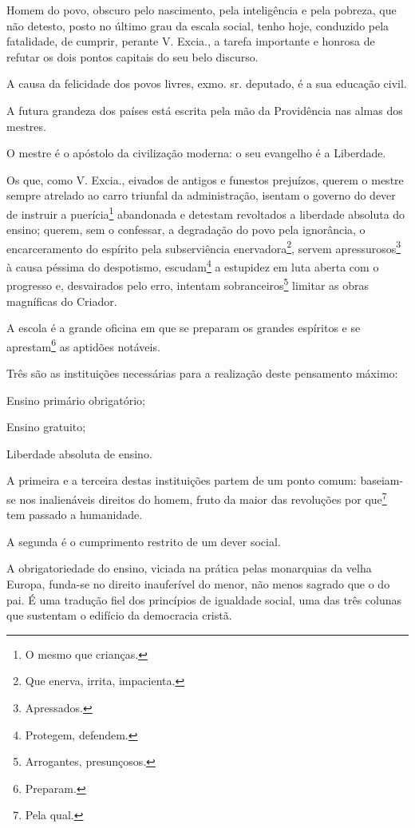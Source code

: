 Homem do povo, obscuro pelo nascimento, pela inteligência e pela
pobreza, que não detesto, posto no último grau da escala social, tenho
hoje, conduzido pela fatalidade, de cumprir, perante V. Excia., a tarefa
importante e honrosa de refutar os dois pontos capitais do seu belo
discurso.

A causa da felicidade dos povos livres, exmo. sr. deputado, é a sua
educação civil.

A futura grandeza dos países está escrita pela mão da Providência nas
almas dos mestres.

O mestre é o apóstolo da civilização moderna: o seu evangelho é a
Liberdade.

Os que, como V. Excia., eivados de antigos e funestos prejuízos, querem
o mestre sempre atrelado ao carro triunfal da administração, isentam o
governo do dever de instruir a puerícia\footnote{O mesmo que crianças.}
abandonada e detestam revoltados a liberdade absoluta do ensino; querem,
sem o confessar, a degradação do povo pela ignorância, o encarceramento
do espírito pela subserviência enervadora\footnote{Que enerva, irrita,
  impacienta.}, servem apressurosos\footnote{Apressados.} à causa
péssima do despotismo, escudam\footnote{Protegem, defendem.} a
estupidez em luta aberta com o progresso e, desvairados pelo erro,
intentam sobranceiros\footnote{Arrogantes, presunçosos.} limitar as
obras magníficas do Criador.

A escola é a grande oficina em que se preparam os grandes espíritos e se
aprestam\footnote{Preparam.} as aptidões notáveis.

Três são as instituições necessárias para a realização deste pensamento
máximo:

Ensino primário obrigatório;

Ensino gratuito;

Liberdade absoluta de ensino.

A primeira e a terceira destas instituições partem de um ponto comum:
baseiam-se nos inalienáveis direitos do homem, fruto da maior das
revoluções por que\footnote{Pela qual.} tem passado a humanidade.

A segunda é o cumprimento restrito de um dever social.

A obrigatoriedade do ensino, viciada na prática pelas monarquias da
velha Europa, funda-se no direito inauferível do menor, não menos
sagrado que o do pai. É uma tradução fiel dos princípios de igualdade
social, uma das três colunas que sustentam o edifício da democracia
cristã.

